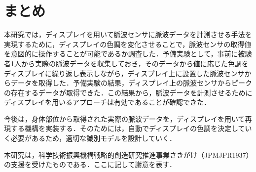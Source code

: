 \documentclass[Japanese,noauthor]{dicomopapers}
\begin{document}
\section{まとめ}
\label{conclude}
本研究では，ディスプレイを用いて脈波センサに脈波データを計測させる手法を実現するために，ディスプレイの色調を変化させることで，脈波センサの取得値を意図的に操作することが可能であるか調査した．予備実験として，事前に被験者1人から実際の脈波データを収集しておき，そのデータから値に応じた色調をディスプレイに繰り返し表示しながら，ディスプレイ上に設置した脈波センサからデータを取得した．予備実験の結果，ディスプレイ上の脈波センサからピークの存在するデータが取得できた．この結果から，脈波データを計測させるためにディスプレイを用いるアプローチは有効であることが確認できた．
\par

今後は，身体部位から取得された実際の脈波データを，ディスプレイを用いて再現する機構を実装する．そのためには，自動でディスプレイの色調を決定していく必要があるため，適切な識別モデルを設計していく．

\begin{acknowledgment}
  本研究は，科学技術振興機構戦略的創造研究推進事業さきがけ（JPMJPR1937）の支援を受けたものである．ここに記して謝意を表す．
\end{acknowledgment}




\end{document}
